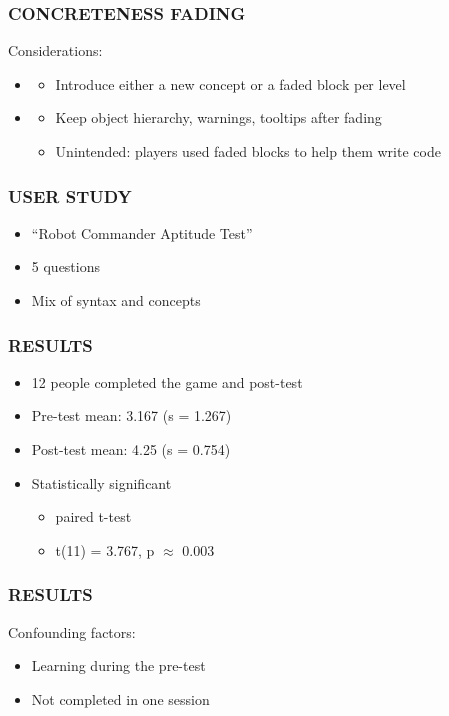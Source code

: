 \documentclass{beamer}
\let\theframetitle\frametitle
\renewcommand\frametitle[1]{\theframetitle{\MakeUppercase{#1}}}
\begin{document}
\begin{frame}
\frametitle{Concreteness Fading}
Considerations:
\begin{itemize}
\item<1-> 
  \begin{itemize}
  \item<2-> Introduce either a new concept or a faded block per level
  \end{itemize}
\item<1-> 
  \begin{itemize}
  \item<3-> Keep object hierarchy, warnings, tooltips after fading
  \item<3-> Unintended: players used faded blocks to help them write code
  \end{itemize}
\end{itemize}
\end{frame}

\begin{frame}
\frametitle{User Study}
\begin{itemize}
\item ``Robot Commander Aptitude Test''
\item 5 questions
\item Mix of syntax and concepts
\end{itemize}
\end{frame}

\begin{frame}
\frametitle{Results}
\begin{itemize}
\item<1-> 12 people completed the game and post-test
\item<1-> Pre-test mean: 3.167 (s = 1.267)
\item<1-> Post-test mean: 4.25 (s = 0.754)
\item<2-> Statistically significant
    \begin{itemize}
    \item paired t-test
    \item t(11) = 3.767, p $\approx$ 0.003
    \end{itemize}
\end{itemize}
\end{frame}

\begin{frame}
\frametitle{Results}
Confounding factors:
\begin{itemize}
\item<1-> Learning during the pre-test
\item<2-> Not completed in one session
\end{itemize}
\end{frame}
\end{document}
